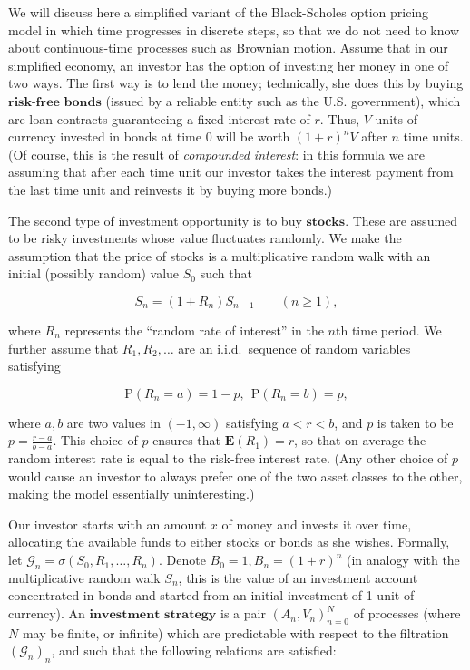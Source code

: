 \documentclass[11pt]{report}
\theoremstyle{plain}
\theoremstyle{definition}
\begin{document}
We will discuss here a simplified variant of the
Black-Scholes option pricing model in which time
progresses in discrete steps, so that we do not need
to know about continuous-time processes such as
Brownian motion. Assume that in our simplified
economy, an investor has the option of investing her
money in one of two ways. The first way is to lend the
money; technically, she does this by buying
$\textbf{risk-free bonds}$ (issued by a reliable
entity such as the U.S. government), which are loan
contracts guaranteeing a fixed interest rate of $r$.
Thus, $V$ units of currency invested in bonds at time
$0$ will be worth $(1+r)^n V$ after $n$ time units.
(Of course, this is the result of \emph{compounded
interest}: in this formula we are assuming that after
each time unit our investor takes the interest payment
from the last time unit and reinvests it by buying
more bonds.)

The second type of investment opportunity is to buy
$\textbf{stocks}$. These are assumed to be risky
investments whose value fluctuates randomly. We make
the assumption that the price of stocks is a
multiplicative random walk with an initial (possibly
random) value $S_0$ such that

\[
S_n = (1+R_n) S_{n-1} \qquad (n\ge1),
\]

\noindent where $R_n$ represents the ``random rate of
interest'' in the $n$th time period. We further
assume that $R_1,R_2,\ldots$ are an i.i.d.\ sequence
of random variables satisfying

\[
\mathrm{P}(R_n = a) = 1-p, \ \ \mathrm{P}(R_n = b) = p,
\]

\noindent where $a,b$ are two values in $(-1,\infty)$
satisfying $a<r<b$, and $p$ is taken to be
$p=\frac{r-a}{b-a}$. This choice of $p$ ensures that
$\mathbf{E}(R_1) = r$, so that on average the random
interest rate is equal to the risk-free interest rate.
(Any other choice of $p$ would cause an investor to
always prefer one of the two asset classes to the
other, making the model essentially uninteresting.)

Our investor starts with an amount $x$ of money and
invests it over time, allocating the available funds
to either stocks or bonds as she wishes. Formally, let
$\mathcal{G}_n = \sigma(S_0,R_1,\ldots,R_n)$. Denote
$B_0=1, B_n=(1+r)^n$ (in analogy with the
multiplicative random walk $S_n$, this is the value
of an investment account concentrated in bonds and
started from an initial investment of 1 unit of
currency). An $\textbf{investment strategy}$ is a
pair $(A_n, V_n)_{n=0}^N$ of processes (where $N$ may
be finite, or infinite) which are predictable with
respect to the filtration $(\mathcal{G}_n)_n$, and
such that the following relations are satisfied:
\end{document}
